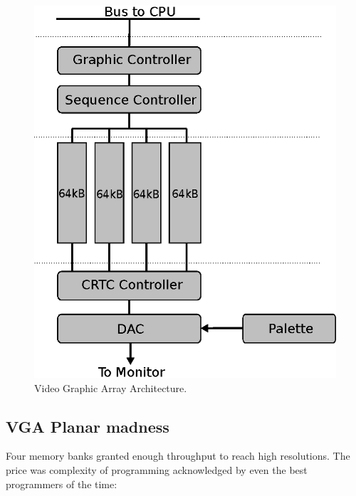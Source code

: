 \documentclass[book.tex]{subfiles}
\begin{document}
\begin{figure}[H]
\centering
\includegraphics[width=\textwidth]{imgs/vga.eps}
\caption{Video Graphic Array Architecture.}
\label{fig:vga_arch}
\end{figure}




\subsection{VGA Planar madness}

Four memory banks granted enough throughput to reach high resolutions. The price was complexity of programming acknowledged by even the best programmers of the time:\\
\end{document}
